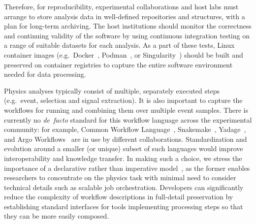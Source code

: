 \documentclass[11pt]{article}
\begin{document}
Therefore, for reproducibility, experimental collaborations and host labs must arrange to store analysis data in well-defined repositories and structures, with a plan for long-term archiving. The host institutions should monitor the correctness and continuing validity of the software by using continuous integration testing on a range of suitable datasets for each analysis. As a part of these tests, Linux container images (e.g.~Docker~\cite{docker}, Podman~\cite{podman}, or Singularity~\cite{singularity}) should be built and preserved on container registries to capture the entire software environment needed for data processing.

Physics analyses typically consist of multiple, separately executed steps (e.g.~event, selection and signal extraction). It is also important to capture the workflows for running and combining them over multiple event samples. There is currently no \emph{de~facto} standard for this workflow language across the experimental community: for example, Common Workflow Language~\cite{CWL}, Snakemake~\cite{SnakeMake}, Yadage~\cite{Cranmer:2017frf,yadage_code}, and Argo Workflows~\cite{argo} are in use by different collaborations. Standardization and evolution around a smaller (or unique) subset of such languages would improve interoperability and knowledge transfer. In making such a choice, we stress the importance of a declarative rather than imperative model~\cite{10.3389/fdata.2021.661501}, as the former enables researchers to concentrate on the physics task with minimal need to consider technical details such as scalable job orchestration. Developers can significantly reduce the complexity of workflow descriptions in full-detail preservation by establishing standard interfaces for tools implementing processing steps so that they can be more easily composed.



\end{document}
